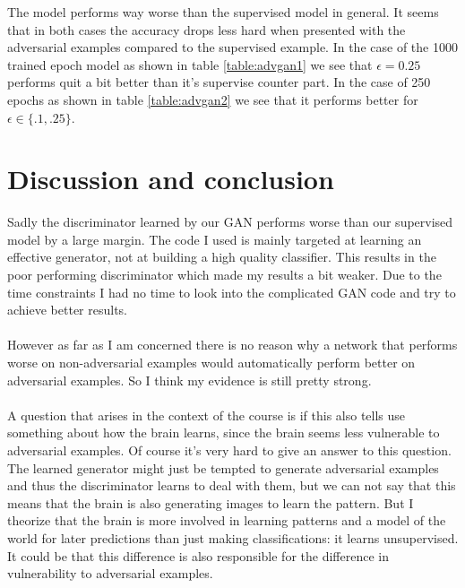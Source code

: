 \documentclass[a4paper]{article}
\begin{document}
\noindent The model performs way worse than the supervised model in general. It seems that in both cases the accuracy drops less hard when presented with the adversarial examples compared to the supervised example. In the case of the 1000 trained epoch model as shown in table \ref{table:advgan1} we see that $\epsilon = 0.25$ performs quit a bit better than it's supervise counter part. In the case of 250 epochs as shown in table \ref{table:advgan2} we see that it performs better for $\epsilon \in \{.1,.25\}$. 
\section{Discussion and conclusion}
Sadly the discriminator learned by our GAN performs worse than our supervised model by  a large margin. The code I used is mainly targeted at learning an effective generator, not at building a high quality classifier. This results in the poor performing discriminator which made my results a bit weaker. Due to the time constraints I had no time to look into the complicated GAN code and try to achieve better results. \\ \\
\noindent However as far as I am concerned there is no reason why a network that performs worse on non-adversarial examples would automatically perform better on adversarial examples. So I think my evidence is still pretty strong. \\ \\
\noindent A question that arises in the context of the course is if this also tells use something about how the brain learns, since the brain seems less vulnerable to adversarial examples. Of course it's very hard to give an answer to this question. The learned generator might just be tempted to generate adversarial examples and thus the discriminator learns to deal with them, but we can not say that this means that the brain is also generating images to learn the pattern. But I theorize that the brain is more involved in learning patterns and a model of the world for later predictions than just making classifications: it learns unsupervised. It could be that this difference is also responsible for the difference in vulnerability to adversarial examples. 

\newpage


\end{document}
